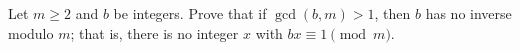 Let $m\ge2$ and $b$ be integers. Prove that if $\gcd(b,m)>1$, then $b$ has no inverse modulo $m$; that is, there is no integer $x$ with $bx\equiv1\pmod m$.
